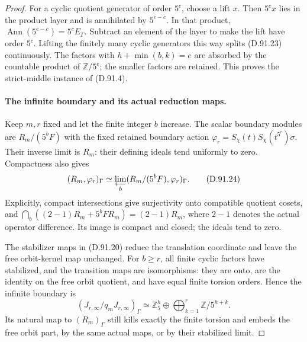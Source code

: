 \begin{proof}
For a cyclic quotient generator of order \(5^c\), choose
a lift \(x\). Then \(5^cx\) lies in the product layer
and is annihilated by \(5^{e-c}\). In that product,
\(\operatorname{Ann}(5^{e-c})=5^c E_\Gamma\). Subtract
an element of the layer to make the lift have order
\(5^c\). Lifting the finitely many cyclic generators
this way splits (D.91.23) continuously. The factors with
\(h+\min(b,k)=e\) are absorbed by the countable product
of \(\mathbb Z/5^e\); the smaller factors are retained.
This proves the strict-middle instance of (D.91.4).

\paragraph{The infinite boundary and its actual reduction maps.}
Keep \(m,r\) fixed and let the finite integer \(b\)
increase. The scalar boundary modules are
\(R_m/(5^bF)\) with the fixed retained boundary action
\(\varphi_r=S_\chi(t)S_\chi(t^{5^r})\sigma\). Their
inverse limit is \(R_m\): their defining ideals tend
uniformly to zero. Compactness also gives
\[
  (R_m,\varphi_r)_\Gamma
       \simeq\varprojlim_b(R_m/(5^bF),\varphi_r)_\Gamma.
                                                               \tag{D.91.24}
\]
Explicitly, compact intersections give surjectivity onto
compatible quotient cosets, and
\(\bigcap_b((2-1)R_m+5^bFR_m)=(2-1)R_m\), where
\(2-1\) denotes the actual operator difference. Its
image is compact and closed; the ideals tend to zero.

The stabilizer maps in (D.91.20) reduce the translation
coordinate and leave the free orbit-kernel map unchanged.
For \(b\ge r\), all finite cyclic factors have stabilized,
and the transition maps are isomorphisms: they are onto,
are the identity on the free orbit quotient, and have
equal finite torsion orders. Hence the infinite boundary is
\[
 (J_{r,\infty}/q_mJ_{r,\infty})_\Gamma
       \simeq\mathbb Z_5^h\oplus
                              \bigoplus_{k=1}^r\mathbb Z/5^{h+k}.
                                                               \tag{D.91.25}
\]
Its natural map to \((R_m)_\Gamma\) still kills exactly
the finite torsion and embeds the free orbit part, by
the same actual maps, or by their stabilized limit.


\end{proof}
